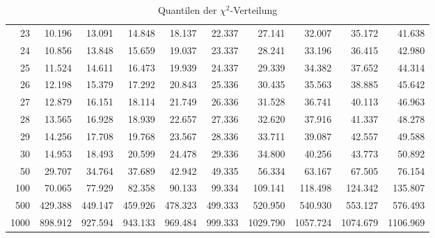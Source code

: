 \begin{table}[h]
\begin{center}
\begin{tabular}{|r|rrr|rrr|rrr|}
23&10.196&13.091&14.848&18.137&22.337&27.141&32.007&35.172&41.638\\
24&10.856&13.848&15.659&19.037&23.337&28.241&33.196&36.415&42.980\\
25&11.524&14.611&16.473&19.939&24.337&29.339&34.382&37.652&44.314\\
26&12.198&15.379&17.292&20.843&25.336&30.435&35.563&38.885&45.642\\
27&12.879&16.151&18.114&21.749&26.336&31.528&36.741&40.113&46.963\\
28&13.565&16.928&18.939&22.657&27.336&32.620&37.916&41.337&48.278\\
29&14.256&17.708&19.768&23.567&28.336&33.711&39.087&42.557&49.588\\
30&14.953&18.493&20.599&24.478&29.336&34.800&40.256&43.773&50.892\\
50&29.707&34.764&37.689&42.942&49.335&56.334&63.167&67.505&76.154\\
100&70.065&77.929&82.358&90.133&99.334&109.141&118.498&124.342&135.807\\
500&429.388&449.147&459.926&478.323&499.333&520.950&540.930&553.127&576.493\\
1000&898.912&927.594&943.133&969.484&999.333&1029.790&1057.724&1074.679&1106.969\\
\hline
\end{tabular}
\end{center}
\caption{Quantilen der $\chi^2$-Verteilung\label{chi2-tabelle}
}
\end{table}

